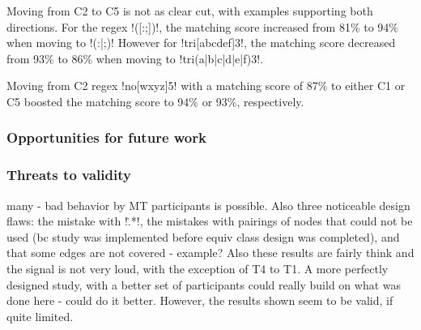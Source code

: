 {Moving from C2 to C5 is not as clear cut, with examples supporting both directions.  For the regex \cverb!([:;])!, the matching score increased from 81\% to 94\% when moving to \cverb!(:|;)!  However for \cverb!tri[abcdef]3!, the matching score decreased from 93\% to 86\% when moving to \cverb!tri(a|b|c|d|e|f)3!.

Moving from C2 regex \cverb!no[wxyz]5! with a matching score of 87\% to either C1 or C5 boosted the matching score to 94\% or 93\%, respectively.


\subsubsection{Opportunities for future work}


\subsubsection{Threats to validity}
many - bad behavior by MT participants is possible.  Also three noticeable design flaws: the mistake with \cverb!\..*!, the mistakes with pairings of nodes that could not be used (bc study was implemented before equiv class design was completed), and that some edges are not covered - example?
Also these results are fairly think and the signal is not very loud, with the exception of T4 to T1.  A more perfectly designed study, with a better set of participants could really build on what was done here - could do it better.  However, the results shown seem to be valid, if quite limited.




}
